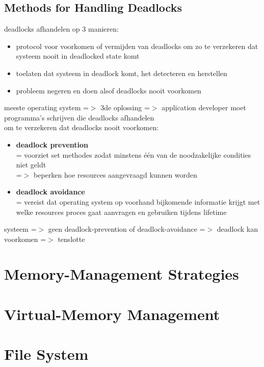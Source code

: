 \documentclass{report}
\begin{document}
\section{Methods for Handling Deadlocks}
deadlocks afhandelen op 3 manieren:
\begin{itemize}
\item protocol voor voorkomen of vermijden van deadlocks om zo te verzekeren dat systeem nooit in deadlocked state komt
\item toelaten dat systeem in deadlock komt, het detecteren en herstellen
\item probleem negeren en doen alsof deadlocks nooit voorkomen
\end{itemize}
meeste operating system =$>$ 3de oplossing =$>$ application developer moet programma's schrijven die deadlocks afhandelen
\\om te verzekeren dat deadlocks nooit voorkomen:
\begin{itemize}
\item \textbf{deadlock prevention} 
\\= voorziet set methodes zodat minstens \'e\'en van de noodzakelijke condities niet geldt
\\=$>$ beperken hoe resources aangevraagd kunnen worden
\item \textbf{deadlock avoidance}
\\= vereist dat operating system op voorhand bijkomende informatie krijgt met welke resources proces gaat aanvragen en gebruiken tijdens lifetime
\end{itemize}
systeem =$>$ geen deadlock-prevention of deadlock-avoidance =$>$ deadlock kan voorkomen =$>$ tenslotte
\chapter{Memory-Management Strategies}
\chapter{Virtual-Memory Management}
\chapter{File System}
\end{document}
